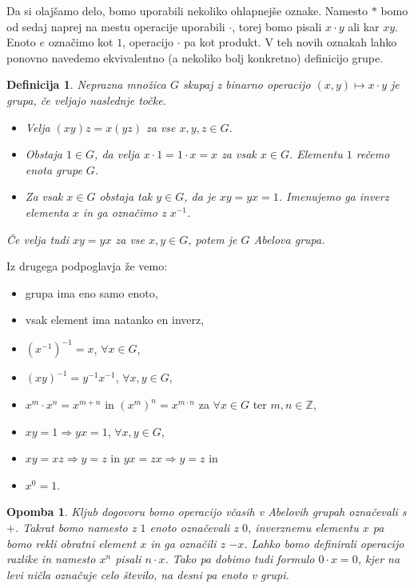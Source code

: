 \documentclass[10pt, a4paper]{article}
\newtheorem{defi}{Definicija}[section]
\newenvironment{noticeB}{%
  \tcolorbox[%
  notitle,
  empty,
  enhanced,  %
  breakable,
  coltext=black,
  colback=white, 
  fontupper=\rmfamily,
  noparskip,
  sharp corners,
  boxrule=-1pt,  %
  frame hidden,
  left=7pt,  %
  right=7pt,
  top=5pt,
  bottom=5pt,
  before skip=2.5ex plus 2pt,
  after skip=2.5ex plus 2pt,
  borderline west = {1.5pt}{-0.1pt}{blue!30!black}, %
  overlay unbroken and last={%
    \draw[color=black, line width=1.25pt]
    ($(frame.south west)+(1.pt, -0.1pt)$) -- ++(2em, 0);
  }
  ]}
{\endtcolorbox}
\newenvironment{definicija}{\begin{noticeB}\begin{defi}}{%
    \end{defi}\end{noticeB}}
\newtheorem*{opomba}{Opomba}
\newcommand{\Z}{\mathbb {Z}}
\begin{document}
Da si olajšamo delo, bomo uporabili nekoliko ohlapnejše oznake.
Namesto $*$ bomo od sedaj naprej na mestu operacije uporabili $\cdot$, 
torej bomo pisali $x \cdot y$ ali kar $xy$.
Enoto $e$ označimo kot $1$, operacijo $\cdot$ pa kot produkt.
V teh novih oznakah lahko ponovno navedemo ekvivalentno (a nekoliko bolj konkretno)
definicijo grupe.

\begin{definicija}
  Neprazna množica $G$ skupaj z binarno operacijo $(x, y) \mapsto x \cdot y$ je grupa, če veljajo naslednje točke.
  \begin{itemize}
    \item Velja $(xy)z = x(yz)$ za vse $x, y, z \in G$.
    \item Obstaja $1 \in G$, da velja $x \cdot 1 = 1 \cdot x = x$ za vsak $x \in G$. Elementu $1$ rečemo enota grupe $G$.
    \item Za vsak $x \in G$ obstaja tak $y \in G$, da je $xy = yx = 1$. Imenujemo ga inverz elementa $x$ in ga označimo z $x^{-1}$.
  \end{itemize}
  Če velja tudi $xy = yx$ za vse $x, y \in G$, potem je $G$ Abelova grupa.
\end{definicija}

Iz drugega podpoglavja že vemo:
\begin{itemize}
  \item grupa ima eno samo enoto,
  \item vsak element ima natanko en inverz,
  \item $(x^{-1})^{-1} = x$, $\forall x \in G$,
  \item $(xy)^{-1} = y^{-1}x^{-1}$, $\forall x, y \in G$,
  \item $x^m \cdot x^n = x^{m + n}$ in $(x^m)^n = x^{m \cdot n}$ za $\forall x \in G$ ter $m, n \in \Z$,
  \item $xy = 1 \Rightarrow yx = 1$, $\forall x, y \in G$, 
  \item $xy = xz \Rightarrow y = z$ in $yx = zx \Rightarrow y = z$ in 
  \item $x^0 = 1$.
\end{itemize}

\begin{opomba}
  Kljub dogovoru bomo operacijo včasih v Abelovih grupah označevali s $+$.
  Takrat bomo namesto z $1$ enoto označevali z $0$,
  inverznemu elementu $x$ pa bomo rekli obratni element $x$ in ga označili z $-x$.
  Lahko bomo definirali operacijo razlike in namesto $x^n$ pisali $n \cdot x$.
  Tako pa dobimo tudi formulo $0 \cdot x = 0$, kjer na levi ničla označuje celo število, na desni pa enoto v grupi. 
\end{opomba}
\end{document}
